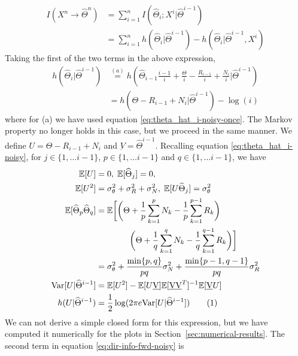 \documentclass[letterpaper, 10pt, conference]{ieeeconf}
\newcommand\numberthis{\stepcounter{equation}\tag{\theequation}}
\begin{document}
\begin{align*}
	I(X^n \rightarrow \widehat\Theta^n) &= \sum_{i=1}^n{I(\widehat\Theta_i ; X^i | \widehat\Theta^{i-1})} \\
									 &= \sum_{i=1}^n{h(\widehat\Theta_i | \widehat\Theta^{i-1}) - h(\widehat\Theta_i | \widehat\Theta^{i-1}, X^i)}
\end{align*}
Taking the first of the two terms in the above expression,
\begin{align*}
	h(\widehat\Theta_i | \widehat\Theta^{i-1}) &\overset{(a)}{=} h(\widehat\Theta_{i-1} \frac{i-1}{i} + \frac{\Theta}{i} - \frac{R_{i-1}}{i} + \frac{N_i}{i} | \widehat\Theta^{i-1}) \\
											   &= h(\Theta - R_{i-1} + N_i | \widehat\Theta^{i-1}) -\log(i)
\end{align*}
where for (a) we have used equation \eqref{eq:theta_hat_i-noisy-once}. The Markov property no longer holds in this case, but we proceed in the same manner. We define $U = \Theta - R_{i-1} + N_i$ and $\underbar{V} = \widehat\Theta^{i-1}$. Recalling equation \eqref{eq:theta_hat_i-noisy}, for $j \in \{1, \ldots i-1\}$, $p \in \{1, \ldots i-1\}$ and $q \in \{1, \ldots i-1\}$, we have
\begin{align*}
	\mathbb{E}[U] &= 0,\;	\mathbb{E}[\widehat\Theta_j] = 0,\;\\	\mathbb{E}[U^2] &= \sigma_\theta^2 + \sigma_R^2 + \sigma_N^2,\;	\mathbb{E}[U \widehat\Theta_j] = \sigma_\theta^2 \\
	\mathbb{E}[\widehat\Theta_p \widehat\Theta_q] &= \mathbb{E} \bigg[ \bigg( \Theta + \frac{1}{p} \sum_{k=1}^p N_k - \frac{1}{p} \sum_{k=1}^{p-1} R_k \bigg)\\
												  & \qquad \qquad \bigg( \Theta + \frac{1}{q} \sum_{k=1}^q N_k - \frac{1}{q} \sum_{k=1}^{q-1} R_k \bigg) \bigg] \\
												  &= \sigma_\theta^2 + \frac{\min\{p, q\}}{pq} \sigma_N^2 + \frac{\min\{p-1, q-1\}}{pq} \sigma_R^2 \\
	\text{Var}[U|\widehat\Theta^{i-1}] &= \mathbb{E}[U^2] - \mathbb{E}[U \underbar{V}] \mathbb{E}[\underbar{V} \underbar{V}^T]^{-1} \mathbb{E}[\underbar{V} U] \\
	h(U | \widehat\Theta^{i-1}) &= \frac{1}{2}\log(2 \pi e \text{Var}[U | \widehat\Theta^{i-1}]) \numberthis \label{eq:h_theta_theta-noisy}
\end{align*}
We can not derive a simple closed form for this expression, but we have computed it numerically for the plots in Section~\ref{sec:numerical-results}. The second term in equation \eqref{eq:dir-info-fwd-noisy} is
\end{document}

